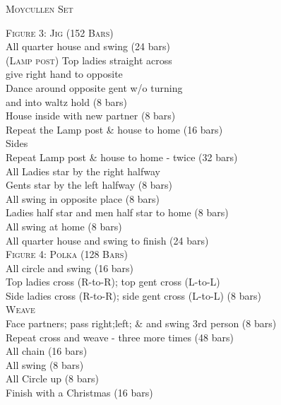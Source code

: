 \begin{center}
\textsc{Moycullen Set} \\
\end{center}

\small \textsc{Figure 3: Jig (152 Bars)}\\


\bodyText
All quarter house and swing  (24 bars)\\
\textsc{(Lamp post)}
Top ladies straight across\\
give right hand to opposite\\
Dance around opposite gent w/o turning\\
and into waltz hold (8 bars)\\
House inside with new partner (8 bars)\\
Repeat the Lamp post \& house to home (16 bars)\\
Sides\\
Repeat Lamp post \& house to home - twice  (32 bars)\\
All Ladies star by the right halfway\\
Gents star by the left halfway (8 bars)\\
All swing in opposite place (8 bars)\\
Ladies half star and men half star to home (8 bars)\\
All swing at home (8 bars)\\
All quarter house and swing to finish (24 bars)\\


\small \textsc{Figure 4: Polka (128 Bars)}\\
All circle and swing (16 bars)\\
Top ladies cross (R-to-R); top gent cross (L-to-L)\\
Side ladies cross (R-to-R); side gent cross (L-to-L) (8 bars) \\
\textsc{Weave} \\
Face partners; pass right;left; \& and swing 3rd person (8 bars)\\
Repeat cross and weave - three more times (48 bars)\\
All chain (16 bars) \\
All swing (8 bars)\\
All Circle up (8 bars)\\
Finish with a Christmas (16 bars)\\
